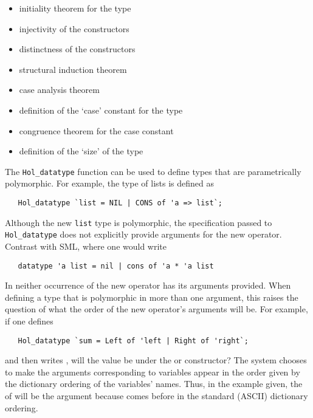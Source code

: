 \begin{itemize}
\item initiality theorem for the type
\item injectivity of the constructors
\item distinctness of the constructors
\item structural induction theorem
\item case analysis theorem
\item definition of the `case' constant for the type
\item congruence theorem for the case constant
\item definition of the `size' of the type
\end{itemize}

The \texttt{Hol\_datatype} function can be used to define types that
are parametrically polymorphic.  For example, the type of lists is
defined as
\begin{hol}
\begin{verbatim}
   Hol_datatype `list = NIL | CONS of 'a => list`;
\end{verbatim}
\end{hol}
\noindent Although the new \texttt{list} type is polymorphic, the
specification passed to \texttt{Hol\_datatype} does not explicitly
provide arguments for the new operator.  Contrast with SML, where one
would write
\begin{hol}
\begin{verbatim}
   datatype 'a list = nil | cons of 'a * 'a list
\end{verbatim}
\end{hol}
\noindent In \HOL{} neither occurrence of the new operator has its
arguments provided.  When defining a type that is polymorphic in more
than one argument, this raises the question of what the order of the
new operator's arguments will be.  For example, if one defines
\begin{hol}
\begin{verbatim}
   Hol_datatype `sum = Left of 'left | Right of 'right`;
\end{verbatim}
\end{hol}
%
and then writes , will the  value be under the
 or  constructor?  The system chooses to make the
arguments corresponding to variables appear in the order given by the
dictionary ordering of the variables' names.  Thus, in the example
given, the  of  will be the  argument
because  comes before  in the standard (ASCII)
dictionary ordering.

